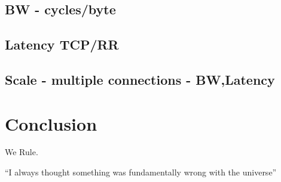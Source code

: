 \documentclass[sigconf,9pt]{acmart}
\begin{document}
\subsection{BW - cycles/byte}
\subsection{Latency TCP/RR}
\subsection{Scale - multiple connections - BW,Latency}


\section{Conclusion}
We Rule.

``I always thought something was fundamentally wrong with the universe'' \citep{adams1995hitchhiker}



\end{document}
